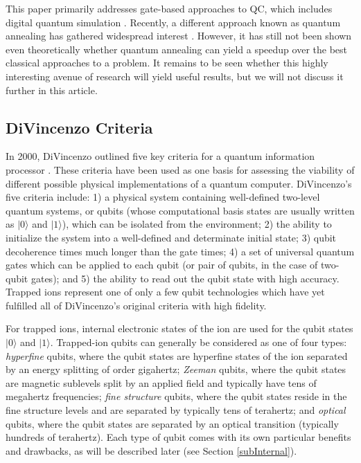 \documentclass[%
12pt,
 amsmath,amssymb,
]{revtex4-2}
\newcommand{\zero}{|0 \rangle}
\newcommand{\one}{|1 \rangle}
\begin{document}
This paper primarily addresses gate-based approaches to QC, which includes digital quantum simulation \cite{UniversalQSimLloyd1996}. Recently, a different approach known as quantum annealing has gathered widespread interest \cite{JohnsonQuantumAnneal2011, BoixoQuantumAnneal100Qubits2014}. However, it has still not been shown even theoretically whether quantum annealing can yield a speedup over the best classical approaches to a problem. It remains to be seen whether this highly interesting avenue of research will yield useful results, but we will not discuss it further in this article.

\subsection{DiVincenzo Criteria}
\label{sec:DiV_criteria}

In 2000, DiVincenzo outlined five key criteria for a quantum information processor \cite{DiVincenzoCriteria2000}. These criteria have been used as one basis for assessing the viability of different possible physical implementations of a quantum computer. DiVincenzo's five criteria include: 1) a physical system containing well-defined two-level quantum systems, or qubits (whose computational basis states are usually written as $\zero$ and $\one$), which can be isolated from the environment; 2) the ability to initialize the system into a well-defined and determinate initial state; 3) qubit decoherence times much longer than the gate times; 4) a set of universal quantum gates which can be applied to each qubit (or pair of qubits, in the case of two-qubit gates); and 5) the ability to read out the qubit state with high accuracy. Trapped ions represent one of only a few qubit technologies which have yet fulfilled all of DiVincenzo's original criteria with high fidelity.

For trapped ions, internal electronic states of the ion are used for the qubit states $\zero$ and $\one$. Trapped-ion qubits can generally be considered as one of four types: \emph{hyperfine} qubits, where the qubit states are hyperfine states of the ion separated by an energy splitting of order gigahertz; \emph{Zeeman} qubits, where the qubit states are magnetic sublevels split by an applied field and typically have tens of megahertz frequencies; \emph{fine structure} qubits, where the qubit states reside in the fine structure levels and are separated by typically tens of terahertz; and \emph{optical} qubits, where the qubit states are separated by an optical transition (typically hundreds of terahertz). Each type of qubit comes with its own particular benefits and drawbacks, as will be described later (see Section \ref{subInternal}).
\end{document}
